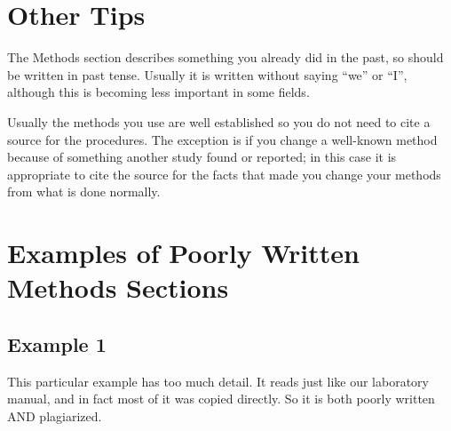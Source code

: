 \documentclass[
]{book}
\begin{document}
\hypertarget{other-tips}{%
\section{Other Tips}\label{other-tips}}

The Methods section describes something you already did in the past, so should be written in past tense. Usually it is written without saying ``we'' or ``I'', although this is becoming less important in some fields.

Usually the methods you use are well established so you do not need to cite a source for the procedures. The exception is if you change a well-known method because of something another study found or reported; in this case it is appropriate to cite the source for the facts that made you change your methods from what is done normally.

\hypertarget{examples-of-poorly-written-methods-sections}{%
\section{Examples of Poorly Written Methods Sections}\label{examples-of-poorly-written-methods-sections}}

\hypertarget{example-1-4}{%
\subsection{Example 1}\label{example-1-4}}

This particular example has too much detail. It reads just like our laboratory manual, and in fact most of it was copied directly. So it is both poorly written AND plagiarized.
\end{document}
